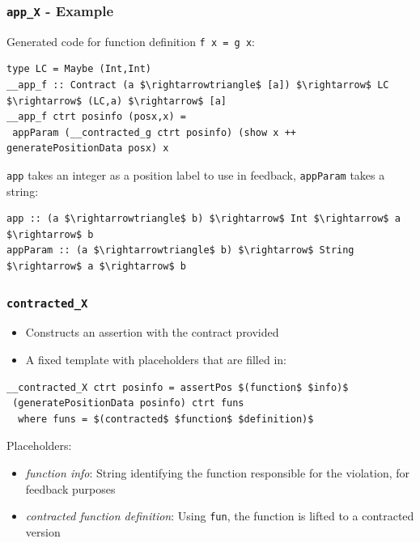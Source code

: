 \documentclass[]{beamer}
\begin{document}
\begin{frame}[fragile]
\frametitle{\texttt{\underline{\hspace{1.5em}}app\_X} - Example}

Generated code for function definition \texttt{f x = g x}:

\begin{lstlisting}[mathescape]
type LC = Maybe (Int,Int)
__app_f :: Contract (a $\rightarrowtriangle$ [a]) $\rightarrow$ LC $\rightarrow$ (LC,a) $\rightarrow$ [a]
__app_f ctrt posinfo (posx,x) =
 appParam (__contracted_g ctrt posinfo) (show x ++ generatePositionData posx) x
\end{lstlisting}

\texttt{app} takes an integer as a position label to use in feedback, \texttt{appParam} takes a string:

\begin{lstlisting}[mathescape]
app :: (a $\rightarrowtriangle$ b) $\rightarrow$ Int $\rightarrow$ a $\rightarrow$ b
appParam :: (a $\rightarrowtriangle$ b) $\rightarrow$ String $\rightarrow$ a $\rightarrow$ b
\end{lstlisting}

\end{frame}

\begin{frame}[fragile]
\frametitle{\texttt{\underline{\hspace{1.5em}}contracted\_X}}

\begin{itemize}
	\item Constructs an assertion with the contract provided
	\item A fixed template with placeholders that are filled in:
\end{itemize}

\begin{lstlisting}[mathescape]
__contracted_X ctrt posinfo = assertPos $(function$ $info)$ 
 (generatePositionData posinfo) ctrt funs
  where funs = $(contracted$ $function$ $definition)$
\end{lstlisting}

Placeholders:
\begin{itemize}
	\item \textit{function info}: String identifying the function responsible for the violation, for feedback purposes
	\item \textit{contracted function definition}: Using \texttt{fun}, the function is lifted to a contracted version
\end{itemize}

\end{frame}
\end{document}
